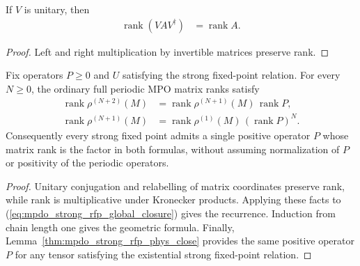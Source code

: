 \begin{lemma}
    \label{thm:unitary_single_kraus_rank}
    \leanok
    If $V$ is unitary, then
    \begin{align}
        \operatorname{rank}(VAV^\dagger) & =\operatorname{rank}A.
        \label{eq:unitary_single_kraus_rank}
    \end{align}
\end{lemma}

\begin{proof}\leanok
    Left and right multiplication by invertible matrices preserve rank.
\end{proof}

\begin{lemma}
    \label{thm:mpdo_strong_rfp_periodic_rank_growth}
    \leanok
    Fix operators $P\geq0$ and $U$ satisfying the strong fixed-point relation. For
    every $N\geq0$, the ordinary full periodic MPO matrix ranks satisfy
    \begin{align}
        \operatorname{rank}\rho^{(N+2)}(M)
         & =\operatorname{rank}\rho^{(N+1)}(M)\,
        \operatorname{rank}P,
        \label{eq:mpdo_strong_rfp_rank_recurrence} \\
        \operatorname{rank}\rho^{(N+1)}(M)
         & =\operatorname{rank}\rho^{(1)}(M)\,
        (\operatorname{rank}P)^N.
        \label{eq:mpdo_strong_rfp_rank_geometric}
    \end{align}
    Consequently every strong fixed point admits a single positive operator
    $P$ whose matrix rank is the factor in both formulas, without assuming
    normalization of $P$ or positivity of the periodic operators.
\end{lemma}

\begin{proof}
    \leanok
    Unitary conjugation and relabelling of matrix coordinates preserve rank,
    while rank is multiplicative under Kronecker products. Applying these
    facts to (\ref{eq:mpdo_strong_rfp_global_closure}) gives the recurrence.
    Induction from chain length one gives the geometric formula. Finally,
    Lemma~\ref{thm:mpdo_strong_rfp_phys_close} provides the same positive
    operator $P$ for any tensor satisfying the existential strong fixed-point
    relation.
\end{proof}

